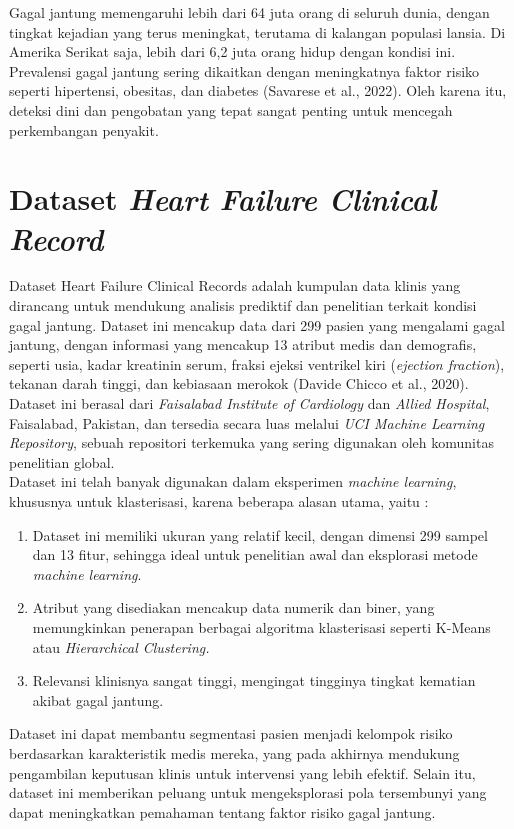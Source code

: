 \documentclass[english,12pt,a4paper,openany]{book}
\begin{document}
	Gagal jantung memengaruhi lebih dari 64 juta orang di seluruh dunia, dengan tingkat kejadian yang terus meningkat, terutama di kalangan populasi lansia. Di Amerika Serikat saja, lebih dari 6,2 juta orang hidup dengan kondisi ini. Prevalensi gagal jantung sering dikaitkan dengan meningkatnya faktor risiko seperti hipertensi, obesitas, dan diabetes (Savarese et al., 2022). Oleh karena itu, deteksi dini dan pengobatan yang tepat sangat penting untuk mencegah perkembangan penyakit.   
	
	
	\section{Dataset \textit{Heart Failure Clinical Record}}
	Dataset Heart Failure Clinical Records adalah kumpulan data klinis yang dirancang untuk mendukung analisis prediktif dan penelitian terkait kondisi gagal jantung. Dataset ini mencakup data dari 299 pasien yang mengalami gagal jantung, dengan informasi yang mencakup 13 atribut medis dan demografis, seperti usia, kadar kreatinin serum, fraksi ejeksi ventrikel kiri (\textit{ejection fraction}), tekanan darah tinggi, dan kebiasaan merokok (Davide Chicco et al., 2020). Dataset ini berasal dari \textit{Faisalabad Institute of Cardiology} dan \textit{Allied Hospital}, Faisalabad, Pakistan, dan tersedia secara luas melalui \textit{UCI Machine Learning Repository}, sebuah repositori terkemuka yang sering digunakan oleh komunitas penelitian global.\\
	
	Dataset ini telah banyak digunakan dalam eksperimen \textit{machine learning}, khususnya untuk klasterisasi, karena beberapa alasan utama, yaitu :
	\begin{enumerate}
		\item Dataset ini memiliki ukuran yang relatif kecil, dengan dimensi 299 sampel dan 13 fitur, sehingga ideal untuk penelitian awal dan eksplorasi metode \textit{machine learning}.
		\item Atribut yang disediakan mencakup data numerik dan biner, yang memungkinkan penerapan berbagai algoritma klasterisasi seperti K-Means atau \textit{Hierarchical Clustering.}
		\item Relevansi klinisnya sangat tinggi, mengingat tingginya tingkat kematian akibat gagal jantung. 
	\end{enumerate}
	Dataset ini dapat membantu segmentasi pasien menjadi kelompok risiko berdasarkan karakteristik medis mereka, yang pada akhirnya mendukung pengambilan keputusan klinis untuk intervensi yang lebih efektif. Selain itu, dataset ini memberikan peluang untuk mengeksplorasi pola tersembunyi yang dapat meningkatkan pemahaman tentang faktor risiko gagal jantung.\\
	
\end{document}
